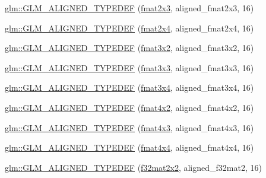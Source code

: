 \begin{DoxyCompactItemize}
\item 
\mbox{\hyperlink{group__gtx__type__aligned_ga0743b4f4f69a3227b82ff58f6abbad62}{glm\+::\+G\+L\+M\+\_\+\+A\+L\+I\+G\+N\+E\+D\+\_\+\+T\+Y\+P\+E\+D\+EF}} (\mbox{\hyperlink{group__gtc__type__precision_ga80f463bcb7e5008c11af5fdbc52c0045}{fmat2x3}}, aligned\+\_\+fmat2x3, 16)
\item 
\mbox{\hyperlink{group__gtx__type__aligned_ga1a76b325fdf70f961d835edd182c63dd}{glm\+::\+G\+L\+M\+\_\+\+A\+L\+I\+G\+N\+E\+D\+\_\+\+T\+Y\+P\+E\+D\+EF}} (\mbox{\hyperlink{group__gtc__type__precision_ga76578ee3c2d6de9b46d0efd1c7060b85}{fmat2x4}}, aligned\+\_\+fmat2x4, 16)
\item 
\mbox{\hyperlink{group__gtx__type__aligned_ga4b4e181cd041ba28c3163e7b8074aef0}{glm\+::\+G\+L\+M\+\_\+\+A\+L\+I\+G\+N\+E\+D\+\_\+\+T\+Y\+P\+E\+D\+EF}} (\mbox{\hyperlink{group__gtc__type__precision_gab194ac1a68dbcb228384112ebe531c67}{fmat3x2}}, aligned\+\_\+fmat3x2, 16)
\item 
\mbox{\hyperlink{group__gtx__type__aligned_ga27b13f465abc8a40705698145e222c3f}{glm\+::\+G\+L\+M\+\_\+\+A\+L\+I\+G\+N\+E\+D\+\_\+\+T\+Y\+P\+E\+D\+EF}} (\mbox{\hyperlink{group__gtc__type__precision_ga577209f19554f5291cc3d66dda9a4388}{fmat3x3}}, aligned\+\_\+fmat3x3, 16)
\item 
\mbox{\hyperlink{group__gtx__type__aligned_ga2608d19cc275830a6f8c0b6405625a4f}{glm\+::\+G\+L\+M\+\_\+\+A\+L\+I\+G\+N\+E\+D\+\_\+\+T\+Y\+P\+E\+D\+EF}} (\mbox{\hyperlink{group__gtc__type__precision_gad68d9daa91ef05b29e80e044931837cf}{fmat3x4}}, aligned\+\_\+fmat3x4, 16)
\item 
\mbox{\hyperlink{group__gtx__type__aligned_ga93f09768241358a287c4cca538f1f7e7}{glm\+::\+G\+L\+M\+\_\+\+A\+L\+I\+G\+N\+E\+D\+\_\+\+T\+Y\+P\+E\+D\+EF}} (\mbox{\hyperlink{group__gtc__type__precision_ga9325d382b334066a4c90a814c9040359}{fmat4x2}}, aligned\+\_\+fmat4x2, 16)
\item 
\mbox{\hyperlink{group__gtx__type__aligned_ga7c117e3ecca089e10247b1d41d88aff9}{glm\+::\+G\+L\+M\+\_\+\+A\+L\+I\+G\+N\+E\+D\+\_\+\+T\+Y\+P\+E\+D\+EF}} (\mbox{\hyperlink{group__gtc__type__precision_ga89195b7b13a41b0f1d34a962d1f66bfb}{fmat4x3}}, aligned\+\_\+fmat4x3, 16)
\item 
\mbox{\hyperlink{group__gtx__type__aligned_ga07c75cd04ba42dc37fa3e105f89455c5}{glm\+::\+G\+L\+M\+\_\+\+A\+L\+I\+G\+N\+E\+D\+\_\+\+T\+Y\+P\+E\+D\+EF}} (\mbox{\hyperlink{group__gtc__type__precision_ga16b508b75c7213ba6b24055ff3b7503d}{fmat4x4}}, aligned\+\_\+fmat4x4, 16)
\item 
\mbox{\hyperlink{group__gtx__type__aligned_ga65ff0d690a34a4d7f46f9b2eb51525ee}{glm\+::\+G\+L\+M\+\_\+\+A\+L\+I\+G\+N\+E\+D\+\_\+\+T\+Y\+P\+E\+D\+EF}} (\mbox{\hyperlink{group__gtc__type__precision_gae7ebbb68656a5fd879d536b5d8452fb1}{f32mat2x2}}, aligned\+\_\+f32mat2, 16)

\end{DoxyCompactItemize}
